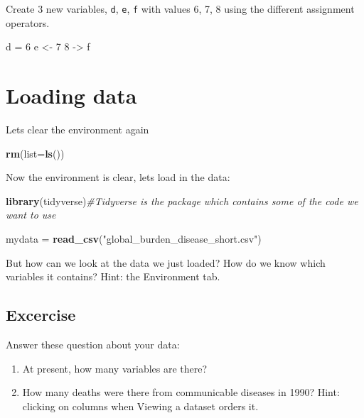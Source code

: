 \documentclass[]{book}
\makeatletter
\newenvironment{Shaded}{\begin{snugshade}}{\end{snugshade}}
\newcommand{\KeywordTok}[1]{\textcolor[rgb]{0.13,0.29,0.53}{\textbf{#1}}}
\newcommand{\DataTypeTok}[1]{\textcolor[rgb]{0.13,0.29,0.53}{#1}}
\newcommand{\DecValTok}[1]{\textcolor[rgb]{0.00,0.00,0.81}{#1}}
\newcommand{\StringTok}[1]{\textcolor[rgb]{0.31,0.60,0.02}{#1}}
\newcommand{\CommentTok}[1]{\textcolor[rgb]{0.56,0.35,0.01}{\textit{#1}}}
\newcommand{\NormalTok}[1]{#1}
\newenvironment{kframe}{%
\medskip{}
\setlength{\fboxsep}{.8em}
 \def\at@end@of@kframe{}%
 \ifinner\ifhmode%
  \def\at@end@of@kframe{\end{minipage}}%
  \begin{minipage}{\columnwidth}%
 \fi\fi%
 \def\FrameCommand##1{\hskip\@totalleftmargin \hskip-\fboxsep
 \colorbox{shadecolor}{##1}\hskip-\fboxsep
     \hskip-\linewidth \hskip-\@totalleftmargin \hskip\columnwidth}%
 \MakeFramed {\advance\hsize-\width
   \@totalleftmargin\z@ \linewidth\hsize
   \@setminipage}}%
 {\par\unskip\endMakeFramed%
 \at@end@of@kframe}
\renewenvironment{Shaded}{\begin{kframe}}{\end{kframe}}
\makeatother
\begin{document}
Create 3 new variables, \texttt{d}, \texttt{e}, \texttt{f} with values
6, 7, 8 using the different assignment operators.

\begin{Shaded}
\begin{Highlighting}[]
\NormalTok{d  =}\StringTok{ }\DecValTok{6}
\NormalTok{e <-}\StringTok{ }\DecValTok{7}
\DecValTok{8}\NormalTok{ ->}\StringTok{ }\NormalTok{f}
\end{Highlighting}
\end{Shaded}

\section{Loading data}\label{loading-data}

Lets clear the environment again

\begin{Shaded}
\begin{Highlighting}[]
\KeywordTok{rm}\NormalTok{(}\DataTypeTok{list=}\KeywordTok{ls}\NormalTok{())}
\end{Highlighting}
\end{Shaded}

Now the environment is clear, lets load in the data:

\begin{Shaded}
\begin{Highlighting}[]
\KeywordTok{library}\NormalTok{(tidyverse)}\CommentTok{#Tidyverse is the package which contains some of the code we want to use}

\NormalTok{mydata =}\StringTok{ }\KeywordTok{read_csv}\NormalTok{(}\StringTok{"global_burden_disease_short.csv"}\NormalTok{)}
\end{Highlighting}
\end{Shaded}

But how can we look at the data we just loaded? How do we know which
variables it contains? Hint: the Environment tab.

\subsection{Excercise}\label{excercise}

Answer these question about your data:

\begin{enumerate}
\def\labelenumi{\arabic{enumi}.}
\item
  At present, how many variables are there?
\item
  How many deaths were there from communicable diseases in 1990? Hint:
  clicking on columns when Viewing a dataset orders it.
\end{enumerate}
\end{document}

